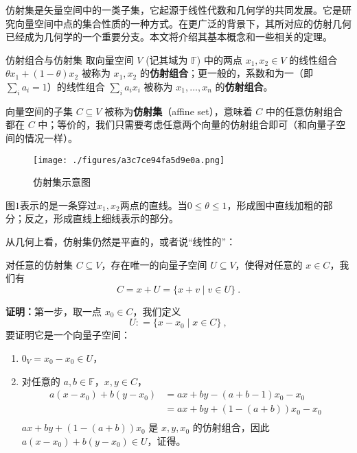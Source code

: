


仿射集是矢量空间中的一类子集，它起源于线性代数和几何学的共同发展。它是研究向量空间中点的集合性质的一种方式。在更广泛的背景下，其所对应的仿射几何已经成为几何学的一个重要分支。本文将介绍其基本概念和一些相关的定理。

\begin{definition}{仿射组合与仿射集}\label{def_AffSet_1}
取向量空间 $V$ (记其域为 $\mathbb{F}$) 中的两点 $x_1, x_2 \in V$ 的线性组合 $\theta x_1 + (1 - \theta) x_2$ 被称为 $x_1, x_2$ 的\textbf{仿射组合}；更一般的，系数和为一（即$\sum_i a_i = 1$）的线性组合 $\sum_i a_i x_i$ 被称为 $x_1, \dots, x_n$ 的\textbf{仿射组合}。

向量空间的子集 $C \subseteq V$ 被称为\textbf{仿射集}（affine set），意味着 $C$ 中的任意仿射组合都在 $C$ 中；等价的，我们只需要考虑任意两个向量的仿射组合即可（和向量子空间的情况一样）。
\end{definition}

\begin{figure}[ht]
\centering
\texttt{[image: ./figures/a3c7ce94fa5d9e0a.png]}
\caption{仿射集示意图} \label{fig_AffSet_1}
\end{figure}

图$1$表示的是一条穿过$x_1,x_2$两点的直线。当$0 \leq \theta \leq 1$，形成图中直线加粗的部分；反之，形成直线上细线表示的部分。

从几何上看，仿射集仍然是平直的，或者说“线性的”：

\begin{theorem}{}\label{the_AffSet_2}
对任意的仿射集 $C \subseteq V$，存在唯一的向量子空间 $U \subseteq V$，使得对任意的 $x \in C$，我们有
\begin{equation}
C = x + U = \{ x + v \mid v \in U\}~.
\end{equation}
\end{theorem}

\textbf{证明：}第一步，取一点 $x_0 \in C$，我们定义
\begin{equation}
U: = \{ x - x_0 \mid x \in C \}~,
\end{equation}
要证明它是一个向量子空间：
\begin{enumerate}
\item $0_V = x_0 - x_0 \in U$，
\item 对任意的 $a, b \in \mathbb{F}$，$x, y \in C$，
    \begin{equation}
    \begin{aligned}
    a (x - x_0) + b (y - x_0) &= a x + b y - (a + b - 1) x_0 - x_0 \\
    &= a x + b y + (1 - (a + b)) x_0 - x_0 \\
    \end{aligned}~
    \end{equation}
$a x + b y + (1 - (a + b)) x_0$ 是 $x, y, x_0$ 的仿射组合，因此 $a (x - x_0) + b (y - x_0) \in U$，证得。
\end{enumerate}

